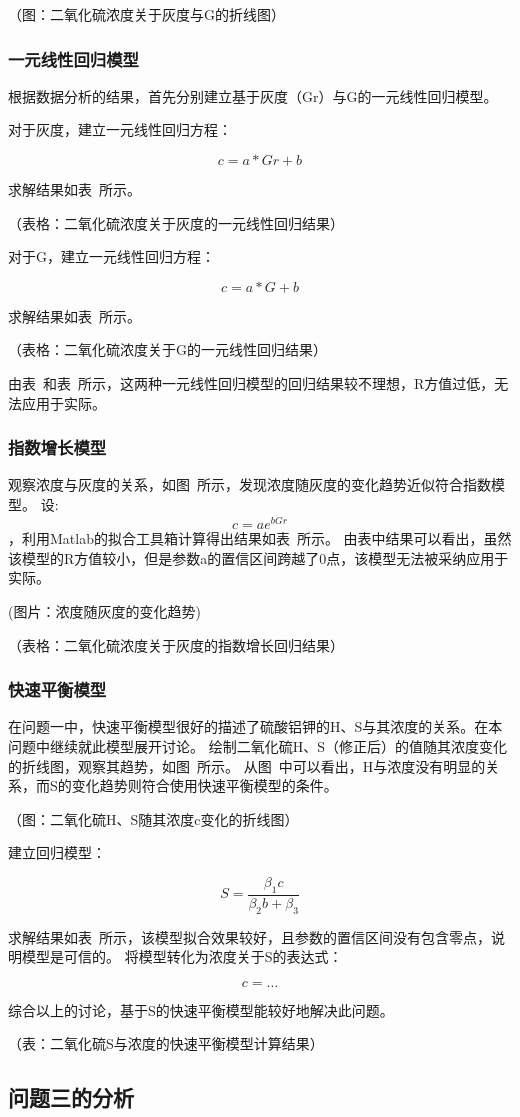 （图：二氧化硫浓度关于灰度与G的折线图）

\subsubsection{一元线性回归模型}

根据数据分析的结果，首先分别建立基于灰度（Gr）与G的一元线性回归模型。

对于灰度，建立一元线性回归方程：

$$c=a*Gr+b$$

求解结果如表~所示。

（表格：二氧化硫浓度关于灰度的一元线性回归结果）

对于G，建立一元线性回归方程：

$$c=a*G+b$$

求解结果如表~所示。

（表格：二氧化硫浓度关于G的一元线性回归结果）

由表~和表~所示，这两种一元线性回归模型的回归结果较不理想，R方值过低，无法应用于实际。

\subsubsection{指数增长模型}

观察浓度与灰度的关系，如图~所示，发现浓度随灰度的变化趋势近似符合指数模型。
设: $$c=ae^{b\dot Gr}$$，利用Matlab的拟合工具箱计算得出结果如表~所示。
由表中结果可以看出，虽然该模型的R方值较小，但是参数a的置信区间跨越了0点，该模型无法被采纳应用于实际。

(图片：浓度随灰度的变化趋势)

（表格：二氧化硫浓度关于灰度的指数增长回归结果）



\subsubsection{快速平衡模型}

在问题一中，快速平衡模型很好的描述了硫酸铝钾的H、S与其浓度的关系。在本问题中继续就此模型展开讨论。
绘制二氧化硫H、S（修正后）的值随其浓度变化的折线图，观察其趋势，如图~所示。
从图~中可以看出，H与浓度没有明显的关系，而S的变化趋势则符合使用快速平衡模型的条件。

（图：二氧化硫H、S随其浓度c变化的折线图）

建立回归模型：

\begin{equation}
    S = \frac{\beta_1 c}{\beta_2b+\beta_3}
\end{equation}

求解结果如表~所示，该模型拟合效果较好，且参数的置信区间没有包含零点，说明模型是可信的。
将模型转化为浓度关于S的表达式：

\begin{equation}
    c = ...
\end{equation}

综合以上的讨论，基于S的快速平衡模型能较好地解决此问题。

（表：二氧化硫S与浓度的快速平衡模型计算结果）


\subsection{问题三的分析}
